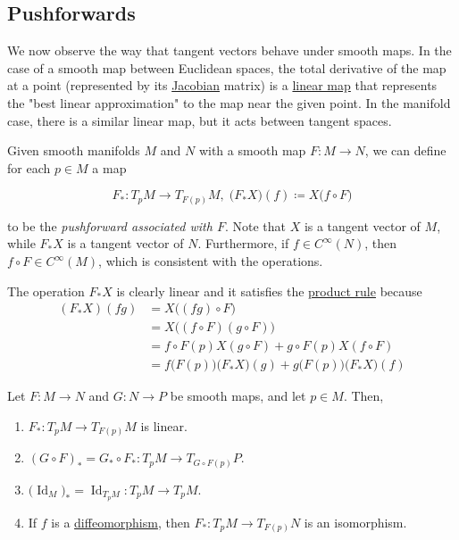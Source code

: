 \documentclass{article}
\DeclareMathOperator{\Id}{Id}
\newcounter{definition}[section]
\begin{document}
  \subsection{Pushforwards}

    We now observe the way that tangent vectors behave under smooth maps. In the case of a smooth map between Euclidean spaces, the total derivative of the map at a point (represented by its \hyperref[mv-def:jacobian]{Jacobian} matrix) is a \hyperref[lin-def:linear_map]{linear map} that represents the "best linear approximation" to the map near the given point. In the manifold case, there is a similar linear map, but it acts between tangent spaces. 

    \begin{definition}
      \label{def:pushforward-of-a-smooth-map}
      Given smooth manifolds $M$ and $N$ with a smooth map $F: M \to N$, we can define for each $p \in M$ a map

        \begin{equation}
          F_*: T_p M \to T_{F(p)} M, \; \big(F_* X \big) (f) \coloneqq X \big( f \circ F \big)
        \end{equation}

      to be the \textit{pushforward associated with $F$}. Note that $X$ is a tangent vector of $M$, while $F_* X$ is a tangent vector of $N$. Furthermore, if $f \in C^\infty(N)$, then $f \circ F \in C^\infty (M)$, which is consistent with the operations. 

      The operation $F_* X$ is clearly linear and it satisfies the \hyperref[mv-thm:product-rule-2]{product rule} because
      \begin{align*}
        (F_* X) (f g) & = X \big((fg) \circ F \big) \\
        & = X \big( (f \circ F) (g \circ F) \big) \\
        & = f \circ F(p) X(g \circ F) + g \circ F(p) X (f \circ F) \\
        & = f\big(F(p)\big) \big( F_* X \big) (g) + g \big( F(p)\big) \big( F_* X\big) (f)
      \end{align*}
    \end{definition}


    \begin{lemma}
      \label{thm:properties-of-pushforwards}
      Let $F: M \to N$ and $G: N \to P$ be smooth maps, and let $p \in M$. Then, 
      \begin{enumerate}
        \item $F_*: T_p M \to T_{F(p)} M$ is linear. 
        \item $(G \circ F)_* = G_* \circ F_* : T_p M \to T_{G \circ F (p)} P$. 
        \item $\big( \Id_M \big)_* = \Id_{T_p M} : T_p M \to T_p M$. 
        \item If $f$ is a \hyperref[def:diffeomorphism-2]{diffeomorphism}, then $F_*: T_p M \to T_{F(p)} N$ is an isomorphism. 
      \end{enumerate}
    \end{lemma}
\end{document}
